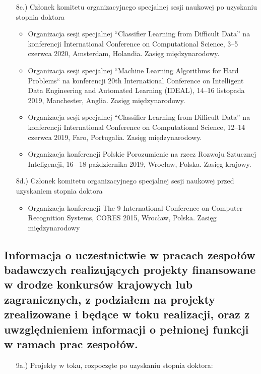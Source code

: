 \begin{fullwidth}
\begin{itemize}
		\item[8c.)] Członek komitetu organizacyjnego specjalnej sesji naukowej po uzyskaniu stopnia doktora
		
		\begin{itemize}
			\item Organizacja sesji specjalnej “Classifier Learning from Difficult Data” na konferencji International Conference on Computational Science, 3–5 czerwca 2020, Amsterdam, Holandia. Zasięg międzynarodowy.
			\item Organizacja sesji specjalnej “Machine Learning Algorithms for Hard Problems“ na konferencji 20th International Conference on Intelligent Data Engineering and Automated Learning (IDEAL), 14–16 listopada 2019, Manchester, Anglia. Zasięg międzynarodowy.
			\item Organizacja sesji specjalnej “Classifier Learning from Difficult Data” na konferencji International Conference on Computational Science, 12–14 czerwca 2019, Faro, Portugalia. Zasięg międzynarodowy.
			\item Organizacja konferencji Polskie Porozumienie na rzecz Rozwoju Sztucznej Inteligencji, 16– 18 października 2019, Wrocław, Polska. Zasięg krajowy.
		\end{itemize}
		
		\item[8d.)] Członek komitetu organizacyjnego specjalnej sesji naukowej przed uzyskaniem stopnia doktora
		
		\begin{itemize}
			\item Organizacja konferencji The 9 International Conference on Computer Recognition Systems, CORES 2015, Wrocław, Polska. Zasięg międzynarodowy
		\end{itemize}
	
	\end{itemize}

\subsection{Informacja o uczestnictwie w pracach zespołów badawczych realizujących projekty finansowane w drodze konkursów krajowych lub zagranicznych, z podziałem na projekty zrealizowane i będące w toku realizacji, oraz z uwzględnieniem informacji o pełnionej funkcji w ramach prac zespołów.}


\begin{itemize}
		\item[9a.)] Projekty w toku, rozpoczęte po uzyskaniu stopnia doktora:	
		

\end{itemize}
\end{fullwidth}
